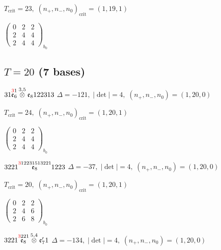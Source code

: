 \documentclass[10pt]{article}
\begin{document}
\hspace{1em}$T_{\text{crit}}=23,\; (n_+,n_-,n_0)_{\text{crit}}=(1,19,1)$

\hspace{2em}$\left(\begin{smallmatrix}0 & 2 & 2 \\ 2 & 4 & 4 \\ 2 & 4 & 4\end{smallmatrix}\right)_{\!b_0}$


\subsection*{$T = 20$ \quad (7 bases)}
\smallskip

$31\overset{\textcolor{red}{3}1}{\mathfrak{e}_6}\overset{3,5}{\otimes}\mathfrak{e}_8122313$ \quad $\Delta=-121,\; |\det|=4,\; (n_+,n_-,n_0)=(1,20,0)$

\hspace{1em}$T_{\text{crit}}=24,\; (n_+,n_-,n_0)_{\text{crit}}=(1,20,1)$

\hspace{2em}$\left(\begin{smallmatrix}0 & 2 & 2 \\ 2 & 4 & 4 \\ 2 & 4 & 4\end{smallmatrix}\right)_{\!b_0}$

\smallskip

$3221\overset{\textcolor{red}{3}12231513221}{\mathfrak{e}_8}1223$ \quad $\Delta=-37,\; |\det|=4,\; (n_+,n_-,n_0)=(1,20,0)$

\hspace{1em}$T_{\text{crit}}=20,\; (n_+,n_-,n_0)_{\text{crit}}=(1,20,1)$

\hspace{2em}$\left(\begin{smallmatrix}0 & 2 & 2 \\ 2 & 4 & 6 \\ 2 & 6 & 8\end{smallmatrix}\right)_{\!b_0}$

\smallskip

$3221\overset{\textcolor{red}{3}221}{\mathfrak{e}_8}\overset{5,4}{\otimes}\mathfrak{e}_7'1$ \quad $\Delta=-134,\; |\det|=4,\; (n_+,n_-,n_0)=(1,20,0)$
\end{document}
